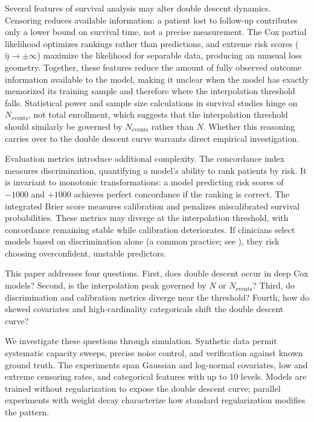 \documentclass[12pt,a4paper]{article}
\begin{document}
Several features of survival analysis may alter double descent dynamics. Censoring reduces available information: a patient lost to follow-up contributes only a lower bound on survival time, not a precise measurement. The Cox partial likelihood \citep{cox1972regression} optimizes rankings rather than predictions, and extreme risk scores ($\hat{\eta} \to \pm\infty$) maximize the likelihood for separable data, producing an unusual loss geometry. Together, these features reduce the amount of fully observed outcome information available to the model, making it unclear when the model has exactly memorized its training sample and therefore where the interpolation threshold falls. Statistical power and sample size calculations in survival studies hinge on $N_{\text{events}}$, not total enrollment, which suggests that the interpolation threshold should similarly be governed by $N_{\text{events}}$ rather than $N$. Whether this reasoning carries over to the double descent curve warrants direct empirical investigation.

Evaluation metrics introduce additional complexity. The concordance index \citep{harrell1996multivariable} measures discrimination, quantifying a model's ability to rank patients by risk. It is invariant to monotonic transformations: a model predicting risk scores of $-1000$ and $+1000$ achieves perfect concordance if the ranking is correct. The integrated Brier score \citep{graf1999assessment} measures calibration and penalizes miscalibrated survival probabilities. These metrics may diverge at the interpolation threshold, with concordance remaining stable while calibration deteriorates. If clinicians select models based on discrimination alone (a common practice; see \citealt{hartman2023pitfalls}), they risk choosing overconfident, unstable predictors.

This paper addresses four questions. First, does double descent occur in deep Cox models? Second, is the interpolation peak governed by $N$ or $N_{\text{events}}$? Third, do discrimination and calibration metrics diverge near the threshold? Fourth, how do skewed covariates and high-cardinality categoricals shift the double descent curve?

We investigate these questions through simulation. Synthetic data permit systematic capacity sweeps, precise noise control, and verification against known ground truth. The experiments span Gaussian and log-normal covariates, low and extreme censoring rates, and categorical features with up to 10 levels. Models are trained without regularization to expose the double descent curve; parallel experiments with weight decay characterize how standard regularization modifies the pattern.
\end{document}
